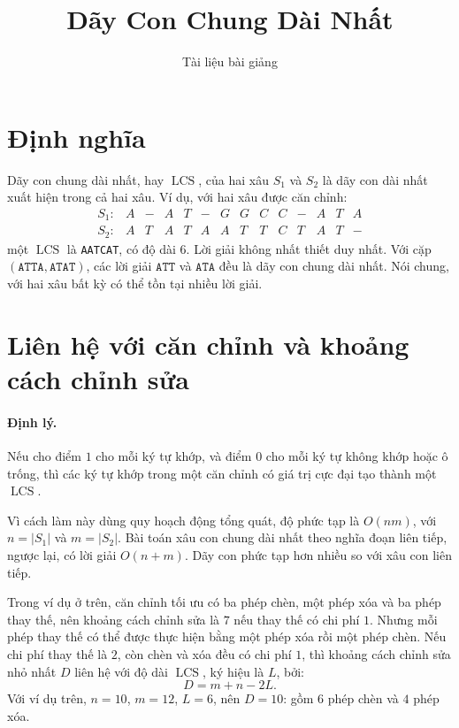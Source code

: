 \documentclass[11pt]{article}
\title{Dãy Con Chung Dài Nhất}
\author{Tài liệu bài giảng}
\date{}
\newcommand{\LCS}{\operatorname{LCS}}
\begin{document}
\maketitle


\section{Định nghĩa}

Dãy con chung dài nhất, hay \(\LCS\), của hai xâu \(S_1\) và \(S_2\) là dãy
con dài nhất xuất hiện trong cả hai xâu. Ví dụ, với hai xâu được căn chỉnh:
\[
\begin{array}{r*{13}{c}}
S_1:& A&-&A&T&-&G&G&C&C&-&A&T&A\\
S_2:& A&T&A&T&A&A&T&T&C&T&A&T&-
\end{array}
\]
một \(\LCS\) là \texttt{AATCAT}, có độ dài \(6\). Lời giải không nhất thiết
duy nhất. Với cặp \((\texttt{ATTA},\texttt{ATAT})\), các lời giải
\(\texttt{ATT}\) và \(\texttt{ATA}\) đều là dãy con chung dài nhất. Nói chung,
với hai xâu bất kỳ có thể tồn tại nhiều lời giải.

\section{Liên hệ với căn chỉnh và khoảng cách chỉnh sửa}

\paragraph{Định lý.}
Nếu cho điểm \(1\) cho mỗi ký tự khớp, và điểm \(0\) cho mỗi ký tự không khớp
hoặc ô trống, thì các ký tự khớp trong một căn chỉnh có giá trị cực đại tạo
thành một \(\LCS\).

Vì cách làm này dùng quy hoạch động tổng quát, độ phức tạp là \(O(nm)\), với
\(n=|S_1|\) và \(m=|S_2|\). Bài toán xâu con chung dài nhất theo nghĩa đoạn
liên tiếp, ngược lại, có lời giải \(O(n+m)\). Dãy con phức tạp hơn nhiều so
với xâu con liên tiếp.

Trong ví dụ ở trên, căn chỉnh tối ưu có ba phép chèn, một phép xóa và ba phép
thay thế, nên khoảng cách chỉnh sửa là \(7\) nếu thay thế có chi phí \(1\).
Nhưng mỗi phép thay thế có thể được thực hiện bằng một phép xóa rồi một phép
chèn. Nếu chi phí thay thế là \(2\), còn chèn và xóa đều có chi phí \(1\), thì
khoảng cách chỉnh sửa nhỏ nhất \(D\) liên hệ với độ dài \(\LCS\), ký hiệu là
\(L\), bởi:
\[
  D=m+n-2L.
\]
Với ví dụ trên, \(n=10\), \(m=12\), \(L=6\), nên \(D=10\): gồm \(6\) phép chèn
và \(4\) phép xóa.
\end{document}
